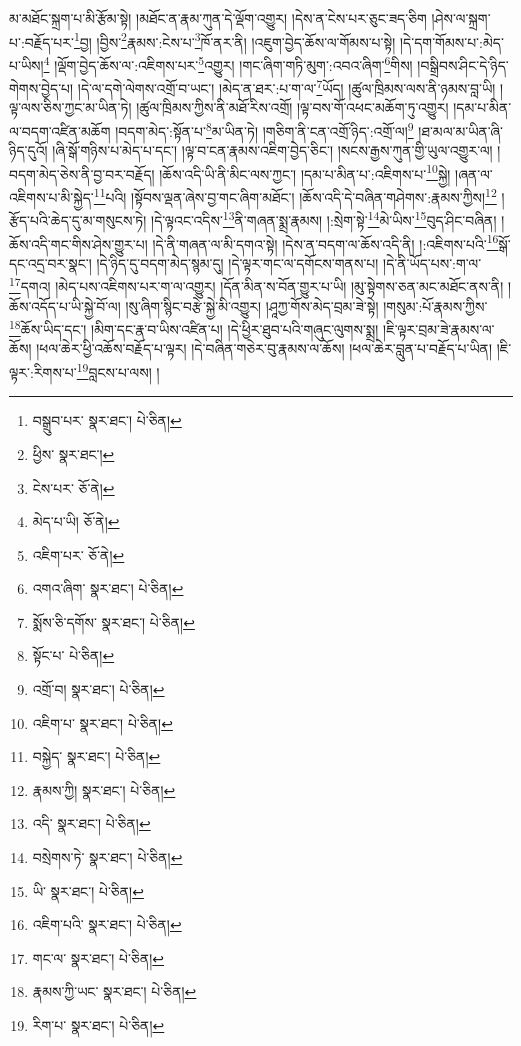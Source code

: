 མ་མཐོང་སྐྲག་པ་མི་རྩོམ་སྟེ། །མཐོང་ན་རྣམ་ཀུན་དེ་ལྡོག་འགྱུར། །དེས་ན་ངེས་པར་ཅུང་ཟད་ཅིག །ཤེས་ལ་སྐྲག་པ་:བརྗོད་པར་\footnote{བསྒྲུབ་པར་  སྣར་ཐང་།  པེ་ཅིན། }བྱ། །བྱིས་\footnote{ཕྱིས་  སྣར་ཐང་། }རྣམས་:ངེས་པ་\footnote{ངེས་པར་  ཅོ་ནེ། }ཁོ་ནར་ནི། །འཇུག་བྱེད་ཆོས་ལ་གོམས་པ་སྟེ། །དེ་དག་གོམས་པ་:མེད་པ་ཡིས།\footnote{མེད་པ་ཡི།  ཅོ་ནེ། } །ལྡོག་བྱེད་ཆོས་ལ་:འཇིགས་པར་\footnote{འཇིག་པར་  ཅོ་ནེ། }འགྱུར། །གང་ཞིག་གཏི་མུག་:འབའ་ཞིག་\footnote{འགའ་ཞིག་  སྣར་ཐང་།  པེ་ཅིན། }གིས། །བསྒྲིབས་ཤིང་དེ་ཉིད་གེགས་བྱེད་པ། །དེ་ལ་དགེ་ལེགས་འགྲོ་བ་ཡང་། །མེད་ན་ཐར་:པ་ག་ལ་\footnote{སྨོས་ཅི་དགོས་  སྣར་ཐང་།  པེ་ཅིན། }ཡོད། །ཚུལ་ཁྲིམས་ལས་ནི་ཉམས་བླ་ཡི། །ལྟ་ལས་ཅིས་ཀྱང་མ་ཡིན་ཏེ། །ཚུལ་ཁྲིམས་ཀྱིས་ནི་མཐོ་རིས་འགྲོ། །ལྟ་བས་གོ་འཕང་མཆོག་ཏུ་འགྱུར། །དམ་པ་མིན་ལ་བདག་འཛིན་མཆོག །བདག་མེད་:སྟོན་པ་\footnote{སྟོང་པ་  པེ་ཅིན། }མ་ཡིན་ཏེ། །གཅིག་ནི་ངན་འགྲོ་ཉིད་:འགྲོ་ལ།\footnote{འགྲོ་བ།  སྣར་ཐང་།  པེ་ཅིན། } །ཐ་མལ་མ་ཡིན་ཞི་ཉིད་དུའོ། །ཞི་སྒོ་གཉིས་པ་མེད་པ་དང་། །ལྟ་བ་ངན་རྣམས་འཇིག་བྱེད་ཅིང་། །སངས་རྒྱས་ཀུན་གྱི་ཡུལ་འགྱུར་ལ། །བདག་མེད་ཅེས་ནི་བྱ་བར་བརྗོད། །ཆོས་འདི་ཡི་ནི་མིང་ལས་ཀྱང་། །དམ་པ་མིན་པ་:འཇིགས་པ་\footnote{འཇིག་པ་  སྣར་ཐང་།  པེ་ཅིན། }སྐྱེ། །ཞན་ལ་འཇིགས་པ་མི་སྐྱེད་\footnote{བསྐྱེད་  སྣར་ཐང་།  པེ་ཅིན། }པའི། །སྟོབས་ལྡན་ཞེས་བྱ་གང་ཞིག་མཐོང་། །ཆོས་འདི་དེ་བཞིན་གཤེགས་:རྣམས་ཀྱིས།\footnote{རྣམས་ཀྱི།  སྣར་ཐང་།  པེ་ཅིན། } །རྩོད་པའི་ཆེད་དུ་མ་གསུངས་ཏེ། །དེ་ལྟའང་འདིས་\footnote{འདི་  སྣར་ཐང་།  པེ་ཅིན། }ནི་གཞན་སྨྲ་རྣམས། །:སྲེག་སྟེ་\footnote{བསྲེགས་ཏེ་  སྣར་ཐང་།  པེ་ཅིན། }མེ་ཡིས་\footnote{ཡི་  སྣར་ཐང་།  པེ་ཅིན། }བུད་ཤིང་བཞིན། །ཆོས་འདི་གང་གིས་ཤེས་གྱུར་པ། །དེ་ནི་གཞན་ལ་མི་དགའ་སྟེ། །དེས་ན་བདག་ལ་ཆོས་འདི་ནི། །:འཇིགས་པའི་\footnote{འཇིག་པའི་  སྣར་ཐང་།  པེ་ཅིན། }སྒོ་དང་འདྲ་བར་སྣང་། །དེ་ཉིད་དུ་བདག་མེད་སྙམ་དུ། །དེ་ལྟར་གང་ལ་དགོངས་གནས་པ། །དེ་ནི་ཡོད་པས་:ག་ལ་\footnote{གང་ལ་  སྣར་ཐང་།  པེ་ཅིན། }དགའ། །མེད་པས་འཇིགས་པར་ག་ལ་འགྱུར། །དོན་མིན་ས་བོན་གྱུར་པ་ཡི། །མུ་སྟེགས་ཅན་མང་མཐོང་ནས་ནི། །ཆོས་འདོད་པ་ཡི་སྐྱེ་བོ་ལ། །སུ་ཞིག་སྙིང་བརྩེ་སྐྱེ་མི་འགྱུར། །ཤཱཀྱ་གོས་མེད་བྲམ་ཟེ་སྟེ། །གསུམ་:པོ་རྣམས་ཀྱིས་\footnote{རྣམས་ཀྱི་ཡང་  སྣར་ཐང་།  པེ་ཅིན། }ཆོས་ཡིད་དང་། །མིག་དང་རྣ་བ་ཡིས་འཛིན་པ། །དེ་ཕྱིར་ཐུབ་པའི་གཞུང་ལུགས་སྨྲ། །ཇི་ལྟར་བྲམ་ཟེ་རྣམས་ལ་ཆོས། །ཕལ་ཆེར་ཕྱི་འཆོས་བརྗོད་པ་ལྟར། །དེ་བཞིན་གཅེར་བུ་རྣམས་ལ་ཆོས། །ཕལ་ཆེར་བླུན་པ་བརྗོད་པ་ཡིན། །ཇི་ལྟར་:རིགས་པ་\footnote{རིག་པ་  སྣར་ཐང་།  པེ་ཅིན། }བླངས་པ་ལས། །
